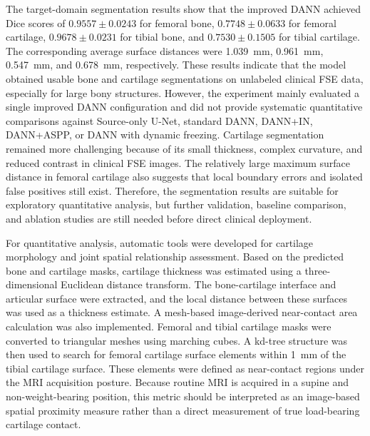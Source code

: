 \begin{digest}
  The target-domain segmentation results show that the improved DANN achieved Dice scores of $0.9557 \pm 0.0243$ for femoral bone, $0.7748 \pm 0.0633$ for femoral cartilage, $0.9678 \pm 0.0231$ for tibial bone, and $0.7530 \pm 0.1505$ for tibial cartilage. The corresponding average surface distances were \qty{1.039}{\milli\metre}, \qty{0.961}{\milli\metre}, \qty{0.547}{\milli\metre}, and \qty{0.678}{\milli\metre}, respectively. These results indicate that the model obtained usable bone and cartilage segmentations on unlabeled clinical FSE data, especially for large bony structures. However, the experiment mainly evaluated a single improved DANN configuration and did not provide systematic quantitative comparisons against Source-only U-Net, standard DANN, DANN+IN, DANN+ASPP, or DANN with dynamic freezing. Cartilage segmentation remained more challenging because of its small thickness, complex curvature, and reduced contrast in clinical FSE images. The relatively large maximum surface distance in femoral cartilage also suggests that local boundary errors and isolated false positives still exist. Therefore, the segmentation results are suitable for exploratory quantitative analysis, but further validation, baseline comparison, and ablation studies are still needed before direct clinical deployment.

  For quantitative analysis, automatic tools were developed for cartilage morphology and joint spatial relationship assessment. Based on the predicted bone and cartilage masks, cartilage thickness was estimated using a three-dimensional Euclidean distance transform. The bone-cartilage interface and articular surface were extracted, and the local distance between these surfaces was used as a thickness estimate. A mesh-based image-derived near-contact area calculation was also implemented. Femoral and tibial cartilage masks were converted to triangular meshes using marching cubes. A kd-tree structure was then used to search for femoral cartilage surface elements within \qty{1}{\milli\metre} of the tibial cartilage surface. These elements were defined as near-contact regions under the MRI acquisition posture. Because routine MRI is acquired in a supine and non-weight-bearing position, this metric should be interpreted as an image-based spatial proximity measure rather than a direct measurement of true load-bearing cartilage contact.


\end{digest}

